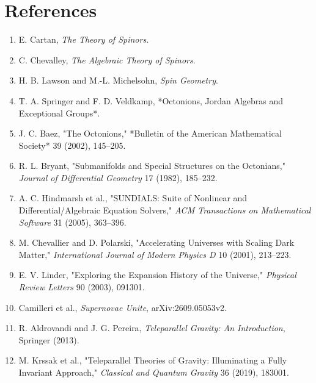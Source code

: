 \documentclass[11pt]{article}
\begin{document}
\section{References}

\begin{enumerate}
\item E. Cartan, \emph{The Theory of Spinors}.
\item C. Chevalley, \emph{The Algebraic Theory of Spinors}.
\item H. B. Lawson and M.-L. Michelsohn, \emph{Spin Geometry}.
\item T. A. Springer and F. D. Veldkamp, *Octonions, Jordan Algebras and
Exceptional Groups*.

\item J. C. Baez, "The Octonions," *Bulletin of the American Mathematical
Society* 39 (2002), 145--205.

\item R. L. Bryant, "Submanifolds and Special Structures on the Octonians,"
\emph{Journal of Differential Geometry} 17 (1982), 185--232.

\item A. C. Hindmarsh et al., "SUNDIALS: Suite of Nonlinear and
Differential/Algebraic Equation Solvers," \emph{ACM Transactions on Mathematical Software} 31 (2005), 363--396.

\item M. Chevallier and D. Polarski, "Accelerating Universes with Scaling Dark
Matter," \emph{International Journal of Modern Physics D} 10 (2001), 213--223.

\item E. V. Linder, "Exploring the Expansion History of the Universe,"
\emph{Physical Review Letters} 90 (2003), 091301.

\item Camilleri et al., \emph{Supernovae Unite}, arXiv:2609.05053v2.
\item R. Aldrovandi and J. G. Pereira, \emph{Teleparallel Gravity: An Introduction},
Springer (2013).

\item M. Krssak et al., "Teleparallel Theories of Gravity: Illuminating a Fully
Invariant Approach," \emph{Classical and Quantum Gravity} 36 (2019), 183001.

\end{enumerate}
\end{document}
